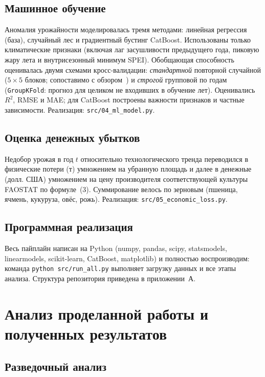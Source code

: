 \documentclass[14pt,a4paper]{extarticle}
\begin{document}
\subsection{Машинное обучение}

Аномалия урожайности моделировалась тремя методами: линейная регрессия (база), случайный лес и градиентный бустинг CatBoost. Использованы только климатические признаки (включая лаг засушливости предыдущего года, пиковую жару лета и внутрисезонный минимум SPEI). Обобщающая способность оценивалась двумя схемами кросс-валидации: \emph{стандартной} повторной случайной ($5\times5$ блоков; сопоставимо с обзором~\cite{vanklompenburg2020}) и \emph{строгой} групповой по годам (\texttt{GroupKFold}: прогноз для целиком не входивших в обучение лет). Оценивались $R^2$, RMSE и MAE; для CatBoost построены важности признаков и частные зависимости. Реализация: \texttt{src/04\_ml\_model.py}.

\subsection{Оценка денежных убытков}

Недобор урожая в год $t$ относительно технологического тренда переводился в физические потери (т) умножением на убранную площадь и далее в денежные (долл. США) умножением на цену производителя соответствующей культуры FAOSTAT по формуле~(3). Суммирование велось по зерновым (пшеница, ячмень, кукуруза, овёс, рожь). Реализация: \texttt{src/05\_economic\_loss.py}.

\subsection{Программная реализация}

Весь пайплайн написан на Python (numpy, pandas, scipy, statsmodels, linearmodels, scikit-learn, CatBoost, matplotlib) и полностью воспроизводим: команда \texttt{python src/run\_all.py} выполняет загрузку данных и все этапы анализа. Структура репозитория приведена в приложении~А.

\section{Анализ проделанной работы и полученных результатов}

\subsection{Разведочный анализ}
\end{document}
